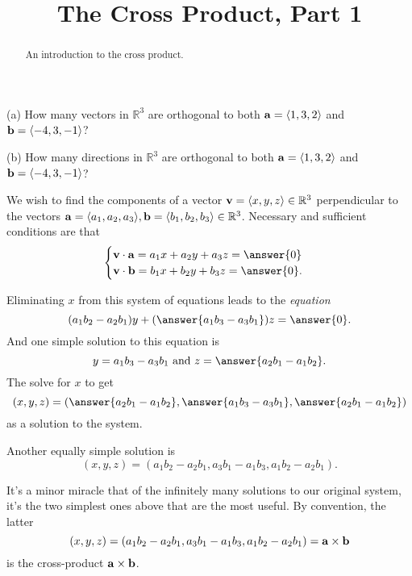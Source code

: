 \documentclass{ximera}
\title{The Cross Product, Part 1}
\begin{document}
\begin{abstract}
An introduction to the cross product.
\end{abstract}
\maketitle

\begin{question}  \label{Q34325rhgt}
(a) How many vectors in $\mathbb{R}^3$ are orthogonal to both ${\bf a}= \langle 1, 3,2 \rangle$ and ${\bf b}=\langle -4,3,-1 \rangle$?
 \begin{multipleChoice}
\end{multipleChoice}

(b) How many directions in $\mathbb{R}^3$ are orthogonal to both ${\bf a}= \langle 1, 3,2 \rangle$ and ${\bf b}=\langle -4,3,-1 \rangle$?
 \begin{multipleChoice}
\end{multipleChoice}



We wish to find the components of a vector ${\bf v}=\langle x, y , z \rangle \in \mathbb{R}^3$ perpendicular to the vectors ${\bf a}=\langle a_1, a_2, a_3 \rangle, {\bf b}=\langle b_1, b_2, b_3 \rangle \in \mathbb{R}^3$.  Necessary and sufficient conditions are that
\[
 \begin{cases}
 {\bf v}\cdot {\bf a} = a_1 x + a_2 y +a_3 z  = \answer{0}  \\
 {\bf v}\cdot {\bf b} = b_1 x + b_2 y +b_3 z  = \answer{0} .
\end{cases}
\]

Eliminating $x$ from this system of equations leads to the \emph{equation}
\[
    (a_1 b_2 - a_2 b_1)y + (\answer{a_1 b_3 - a_3 b_1})z = \answer{0}  .
\]
And one simple solution to this equation is
\[
     y = a_1 b_3 - a_3 b_1  \text{ and } z = \answer{a_2 b_1 - a_1 b_2} .
\]
The solve for $x$ to get
\[
       (x, y, z) = (   \answer{a_2 b_1 - a_1 b_2}     ,    \answer{ a_1 b_3 - a_3 b_1}        ,    \answer{a_2 b_1 - a_1 b_2}    )
\]
as a solution to the system.

Another equally simple solution is
\[ 
         (x, y, z) = (   a_1 b_2 - a_2 b_1     ,     a_3 b_1 - a_1 b_3        ,   a_1 b_2 - a_2 b_1    ) .
\]

It's a minor miracle that of the infinitely many solutions to our original system, it's the two simplest ones above that are the most useful. By convention, the latter
\[ 
         (x, y, z) = (   a_1 b_2 - a_2 b_1     ,     a_3 b_1 - a_1 b_3        ,   a_1 b_2 - a_2 b_1    ) = {\bf a}\times {\bf b}
\]
is the cross-product ${\bf a}\times {\bf b}$.

\end{question}
\end{document}
